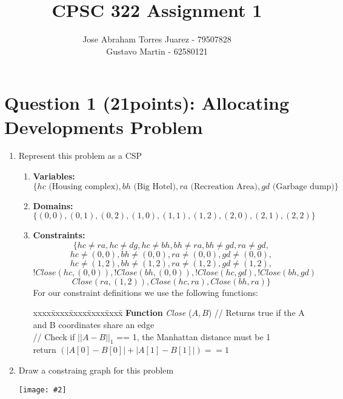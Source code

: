 \documentclass{article}
\def\ans#1{{\color{ans}#1}}
\newcommand{\centerfig}[2]{\begin{center}\texttt{[image: \#2]}\end{center}}
\begin{document}
\title{CPSC 322 Assignment 1}
\author{
    Jose Abraham Torres Juarez - 79507828 \\
    Gustavo Martin - 62580121
}
\date{}
\maketitle
\vspace{-2em}


\section{Question 1 (21points): Allocating Developments Problem}

\begin{enumerate}[label=(\alph*)]
    \item Represent this problem as a CSP
    \begin{enumerate}\color{ans}
        \item \textbf{Variables: }
        \[
            \{ hc \text{ (Housing complex)}, bh \text{ (Big Hotel)}, ra \text{ (Recreation Area)}, gd \text{ (Garbage dump)}\}
        \]
        \item \textbf{Domains: }
        \[
            \{ (0,0), (0,1), (0,2), (1,0), (1,1), (1,2), (2,0), (2,1), (2,2) \}
        \]
        \item \textbf{Constraints: }
        \[
            \{ hc \neq ra, hc \neq dg, hc \neq bh, bh \neq ra, bh \neq gd, ra \neq gd,
        \]
        \[
            hc \neq (0,0), bh \neq (0,0), ra \neq (0,0), gd \neq (0,0),
        \]
        \[
            hc \neq (1,2), bh \neq (1,2), ra \neq (1,2), gd \neq (1,2),
        \]
        \[
            !Close(hc,(0,0)), !Close(bh,(0,0)), !Close(hc,gd), !Close(bh,gd)
        \]
        \[
            Close(ra,(1,2)), Close(hc,ra), Close(bh,ra) \}
        \]
        \ans{
            For our constraint definitions we use the following functions:
        }
        \begin{tabbing}
        xxxx\=xxxx\=xxxx\=xxxx\=xxxx\= \kill \color{ans}
        {\bf Function} {\em Close} ($A,B$) // Returns true if the A and B coordinates share an edge \\ [0pt \color{ans}]
        \> // Check if $|| A - B ||_1$ == 1, the Manhattan distance must be 1\\
        \> return $( |A[0] - B[0]| + |A[1] - B[1]| ) == 1$ \\
        \end{tabbing}
    \end{enumerate}
    \item Draw a constraing graph for this problem
    \centerfig{0.8}{../figs/q1.png}
\end{enumerate}
\end{document}
